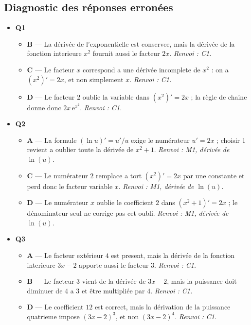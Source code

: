 \subsection*{Diagnostic des réponses erronées}

\begin{itemize}
  \item \textbf{Q1}
  \begin{itemize}
    \item \textbf{B} — La dérivée de l'exponentielle est conservee, mais la dérivée de la fonction interieure $x^2$ fournit aussi le facteur $2x$. \emph{Renvoi : C1.}
    \item \textbf{C} — Le facteur $x$ correspond a une dérivée incomplete de $x^2$ : on a $(x^2)'=2x$, et non simplement $x$. \emph{Renvoi : C1.}
    \item \textbf{D} — Le facteur $2$ oublie la variable dans $(x^2)'=2x$ ; la règle de chaine donne donc $2x\,\mathrm{e}^{x^2}$. \emph{Renvoi : C1.}
  \end{itemize}
  \item \textbf{Q2}
  \begin{itemize}
    \item \textbf{A} — La formule $(\ln u)'=u'/u$ exige le numérateur $u'=2x$ ; choisir $1$ revient a oublier toute la dérivée de $x^2+1$. \emph{Renvoi : M1, dérivée de $\ln(u)$.}
    \item \textbf{C} — Le numérateur $2$ remplace a tort $(x^2)'=2x$ par une constante et perd donc le facteur variable $x$. \emph{Renvoi : M1, dérivée de $\ln(u)$.}
    \item \textbf{D} — Le numérateur $x$ oublie le coefficient $2$ dans $(x^2+1)'=2x$ ; le dénominateur seul ne corrige pas cet oubli. \emph{Renvoi : M1, dérivée de $\ln(u)$.}
  \end{itemize}
  \item \textbf{Q3}
  \begin{itemize}
    \item \textbf{A} — Le facteur extérieur $4$ est present, mais la dérivée de la fonction interieure $3x-2$ apporte aussi le facteur $3$. \emph{Renvoi : C1.}
    \item \textbf{B} — Le facteur $3$ vient de la dérivée de $3x-2$, mais la puissance doit diminuer de $4$ a $3$ et être multipliée par $4$. \emph{Renvoi : C1.}
    \item \textbf{D} — Le coefficient $12$ est correct, mais la dérivation de la puissance quatrieme impose $(3x-2)^3$, et non $(3x-2)^4$. \emph{Renvoi : C1.}
  \end{itemize}

\end{itemize}
